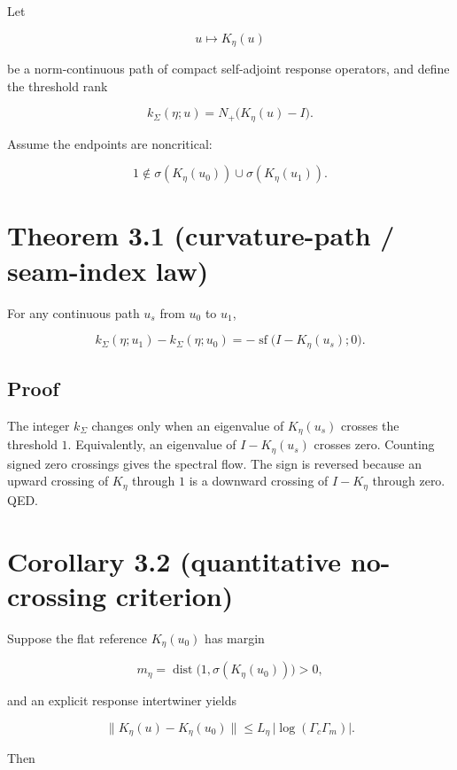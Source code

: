 Let

\[
u\mapsto K_\eta(u)
\]

be a norm-continuous path of compact self-adjoint response operators, and define the threshold rank

\[
k_\Sigma(\eta;u)=N_+\bigl(K_\eta(u)-I\bigr).
\]

Assume the endpoints are noncritical:

\[
1\notin\sigma(K_\eta(u_0))\cup\sigma(K_\eta(u_1)).
\]

\hypertarget{theorem-3.1-curvature-path-seam-index-law}{%
\section{Theorem 3.1 (curvature-path / seam-index law)}\label{theorem-3.1-curvature-path-seam-index-law}}

For any continuous path \(u_s\) from \(u_0\) to \(u_1\),

\[
\boxed{
k_\Sigma(\eta;u_1)-k_\Sigma(\eta;u_0)
=-\operatorname{sf}\bigl(I-K_\eta(u_s);0\bigr).
}
\]

\hypertarget{proof}{%
\subsection{Proof}\label{proof}}

The integer \(k_\Sigma\) changes only when an eigenvalue of \(K_\eta(u_s)\) crosses the threshold \(1\). Equivalently, an eigenvalue of \(I-K_\eta(u_s)\) crosses zero. Counting signed zero crossings gives the spectral flow. The sign is reversed because an upward crossing of \(K_\eta\) through \(1\) is a downward crossing of \(I-K_\eta\) through zero. QED.

\hypertarget{corollary-3.2-quantitative-no-crossing-criterion}{%
\section{Corollary 3.2 (quantitative no-crossing criterion)}\label{corollary-3.2-quantitative-no-crossing-criterion}}

Suppose the flat reference \(K_\eta(u_0)\) has margin

\[
m_\eta=\operatorname{dist}\bigl(1,\sigma(K_\eta(u_0))\bigr)>0,
\]

and an explicit response intertwiner yields

\[
\|K_\eta(u)-K_\eta(u_0)\|
\le L_\eta\,|\log(\Gamma_c\Gamma_m)|.
\]

Then

